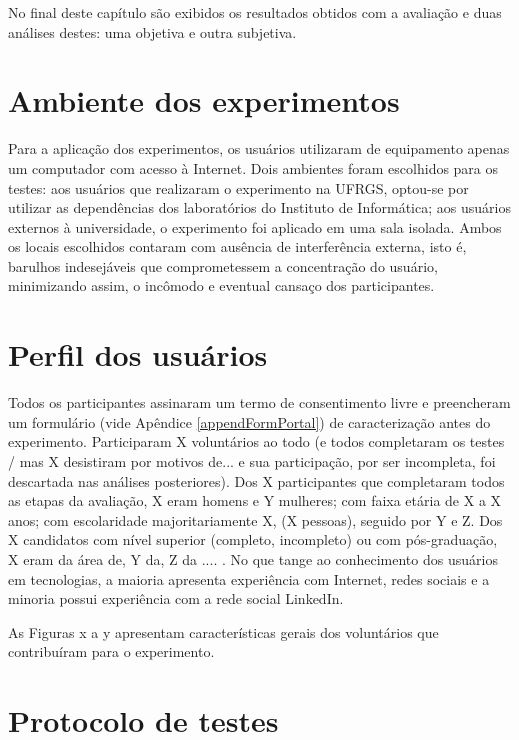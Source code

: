 \documentclass[cic,tc]{iiufrgs}
\begin{document}
No final deste capítulo são exibidos os resultados obtidos com a avaliação e duas análises destes: uma objetiva e outra subjetiva.

\section{Ambiente dos experimentos}
\label{avaliacaoAmbiente}

Para a aplicação dos experimentos, os usuários utilizaram de equipamento apenas um computador com acesso à Internet. Dois ambientes foram escolhidos para os testes: aos usuários que realizaram o experimento na UFRGS, optou-se por utilizar as dependências dos laboratórios do Instituto de Informática; aos usuários externos à universidade, o experimento foi aplicado em uma sala isolada. Ambos os locais escolhidos contaram com ausência de interferência externa, isto é, barulhos indesejáveis que comprometessem a concentração do usuário, minimizando assim, o incômodo e eventual cansaço dos participantes.

\section{Perfil dos usuários}
\label{avaliacaoPefil}

Todos os participantes assinaram um termo de consentimento livre e preencheram um formulário (vide Apêndice \ref{appendFormPortal}) de caracterização antes do experimento. Participaram X voluntários ao todo (e todos completaram os testes / mas X desistiram por motivos de... e sua participação, por ser incompleta, foi descartada nas análises posteriores). Dos X participantes que completaram todos as etapas da avaliação, X eram homens e Y mulheres; com faixa etária de X a X anos; com escolaridade majoritariamente X, (X pessoas), seguido por Y e Z. Dos X candidatos com nível superior (completo, incompleto) ou com pós-graduação, X eram da área de, Y da, Z da .... . No que tange ao conhecimento dos usuários em tecnologias, a maioria apresenta experiência com Internet, redes sociais e a minoria possui experiência com a rede social LinkedIn.

As Figuras x a y apresentam características gerais dos voluntários que contribuíram para o experimento.

\section{Protocolo de testes}
\label{avaliacaoProtocolo}
\end{document}
